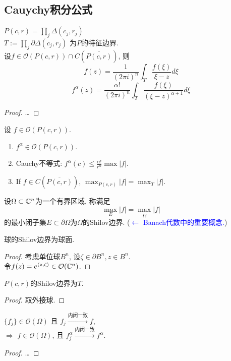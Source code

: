 \subsection{Cauychy积分公式}
\noindent $P(c,r)=\prod_{j} \Delta(c_j,r_j)$\\ 
$T:=\prod_{j} \partial \Delta(c_j,r_j)$ 为$P$的特征边界.\\
设$f \in \mathcal{O}(P(c,r)) \cap C(\overline{P(c,r)})$, 则
$$  f(z)=\frac{1}{(2 \pi i)^n} \int_{T} \frac{f(\xi )}{\xi -z} d \xi  $$   
$$  f^{\alpha }(z)=\frac{\alpha !}{(2 \pi i)^n} \int_{T} \frac{f(\xi )}{(\xi -z)^{\alpha +1}} d \xi  $$  
\begin{proof}
  \dots
\end{proof}

\begin{property}
  设 $f \in \mathcal{O}(P(c,r))$.
  \begin{enumerate}
    \item $f^\alpha  \in \mathcal{O}(P(c,r))$.
    \item Cauchy不等式: $f^\alpha (c) \leq \frac{\alpha !}{r^\alpha } \max |f|$.
    \item If $f \in C(\overline{P(c,r)})$, $\max_{P(c,r)}|f|=\max_{T}|f|$.  
  \end{enumerate}
\end{property}

\begin{definition}
  设$\Omega \subset {\mathbb C}^n$为一个有界区域, 称满足
  $$ \max_{E}|f|=\max_{\bar \Omega }|f| $$
  的最小闭子集$E \subset \partial \Omega $为$\Omega $的Shilov边界. (\textcolor{blue}{$\leftarrow$ Banach代数中的重要概念.})
\end{definition}

\begin{example}
  球的Shilov边界为球面.
  \begin{proof}
    考虑单位球$B^n$, 设$\zeta \in \partial B^n, z \in B^n$.\\
    令$f(z)=e^{\langle z,\zeta  \rangle } \in \mathcal{O}({\mathbb C}^n)$.
  \end{proof}
\end{example}
\begin{example}
  $P(c,r)$的Shilov边界为$T$.
  \begin{proof}
    取外接球.
  \end{proof}
\end{example}

\begin{theorem}[Weierstrass]
  $\{f_j\} \in \mathcal{O}(\Omega )$ 且 $f_j \xrightarrow{\text{内闭一致}}f$, \\
  $\Rightarrow $ $f \in \mathcal{O}(\Omega )$,   且 $f^\alpha_j  \xrightarrow{\text{内闭一致}}f^\alpha $.
\end{theorem}
\begin{proof}
  \dots
\end{proof}

